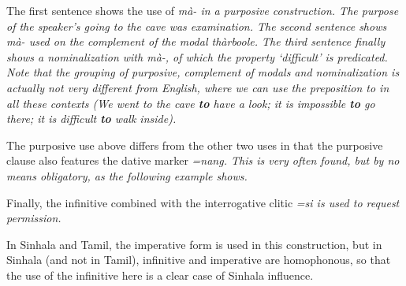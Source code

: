 The first sentence shows the use of \em mà- \em in a purposive construction. The purpose of the speaker's going to the cave was examination. The second sentence shows \em mà- \em used on the complement of the modal \em thàrboole\em. The third sentence finally shows a  nominalization with \em mà-\em, of which the property `difficult' is predicated. Note that the grouping of purposive, complement of modals and nominalization is actually not very different from English, where we can use the preposition \em to \em in all these contexts (\em We went to the cave \textbf{to} have  a look; it is impossible \textbf{to} go there; it is difficult \textbf{to} walk inside\em).

The purposive use above differs from the other two uses in that the purposive clause also features the dative marker \em =nang\em. This is very often found, but by no means obligatory, as the following example shows.

 

Finally, the infinitive combined with the interrogative clitic \em =si \em is used to request permission.


In Sinhala and Tamil, the imperative form is used in this construction, but in Sinhala (and not in Tamil), infinitive and imperative are homophonous, so that the use of the infinitive here is a clear case of Sinhala influence.

